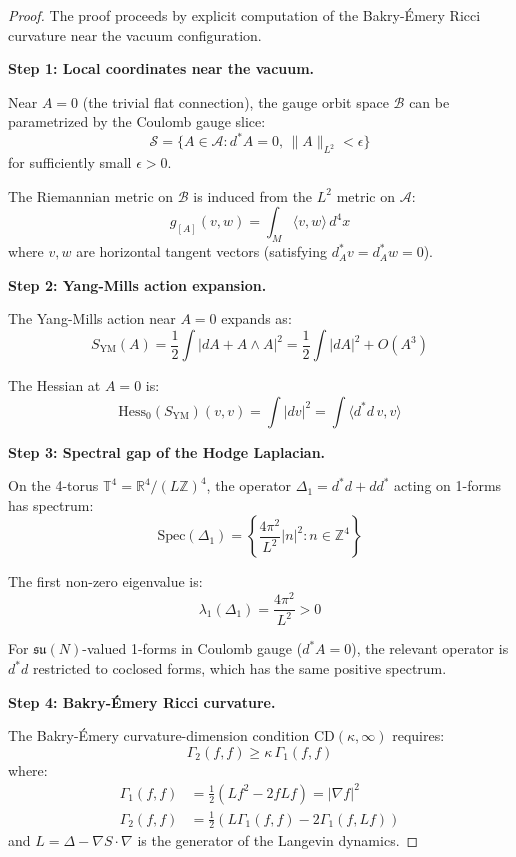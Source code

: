\begin{proof}
The proof proceeds by explicit computation of the Bakry-Émery Ricci curvature 
near the vacuum configuration.

\textbf{Step 1: Local coordinates near the vacuum.}

Near $A = 0$ (the trivial flat connection), the gauge orbit space $\mathcal{B}$ 
can be parametrized by the Coulomb gauge slice:
\[
\mathcal{S} = \{A \in \mathcal{A} : d^*A = 0, \, \|A\|_{L^2} < \epsilon\}
\]
for sufficiently small $\epsilon > 0$.

The Riemannian metric on $\mathcal{B}$ is induced from the $L^2$ metric on $\mathcal{A}$:
\[
g_{[A]}(v, w) = \int_{M} \langle v, w \rangle \, d^4x
\]
where $v, w$ are horizontal tangent vectors (satisfying $d_A^* v = d_A^* w = 0$).

\textbf{Step 2: Yang-Mills action expansion.}

The Yang-Mills action near $A = 0$ expands as:
\[
S_{\text{YM}}(A) = \frac{1}{2}\int |dA + A \wedge A|^2 = \frac{1}{2}\int |dA|^2 + O(A^3)
\]

The Hessian at $A = 0$ is:
\[
\text{Hess}_0(S_{\text{YM}})(v, v) = \int |dv|^2 = \int \langle d^*d \, v, v \rangle
\]

\textbf{Step 3: Spectral gap of the Hodge Laplacian.}

On the 4-torus $\mathbb{T}^4 = \mathbb{R}^4/(L\mathbb{Z})^4$, the operator 
$\Delta_1 = d^*d + dd^*$ acting on 1-forms has spectrum:
\[
\text{Spec}(\Delta_1) = \left\{\frac{4\pi^2}{L^2}|n|^2 : n \in \mathbb{Z}^4\right\}
\]

The first non-zero eigenvalue is:
\[
\lambda_1(\Delta_1) = \frac{4\pi^2}{L^2} > 0
\]

For $\mathfrak{su}(N)$-valued 1-forms in Coulomb gauge ($d^*A = 0$), the 
relevant operator is $d^*d$ restricted to coclosed forms, which has the same 
positive spectrum.

\textbf{Step 4: Bakry-Émery Ricci curvature.}

The Bakry-Émery curvature-dimension condition $\text{CD}(\kappa, \infty)$ requires:
\[
\Gamma_2(f, f) \geq \kappa \, \Gamma_1(f, f)
\]
where:
\begin{align*}
\Gamma_1(f, f) &= \frac{1}{2}(L f^2 - 2f Lf) = |\nabla f|^2 \\
\Gamma_2(f, f) &= \frac{1}{2}(L \Gamma_1(f, f) - 2\Gamma_1(f, Lf))
\end{align*}
and $L = \Delta - \nabla S \cdot \nabla$ is the generator of the Langevin dynamics.


\end{proof}
